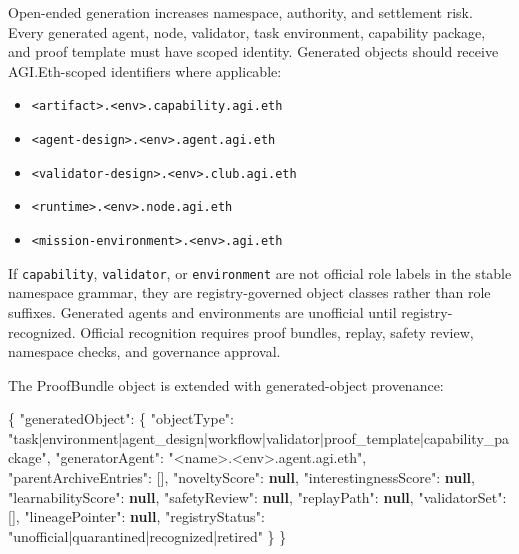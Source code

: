 \documentclass[
  11pt,
]{article}
\newenvironment{Shaded}{}{}
\newcommand{\DataTypeTok}[1]{\textcolor[rgb]{0.56,0.13,0.00}{#1}}
\newcommand{\FunctionTok}[1]{\textcolor[rgb]{0.02,0.16,0.49}{#1}}
\newcommand{\KeywordTok}[1]{\textcolor[rgb]{0.00,0.44,0.13}{\textbf{#1}}}
\newcommand{\OtherTok}[1]{\textcolor[rgb]{0.00,0.44,0.13}{#1}}
\newcommand{\StringTok}[1]{\textcolor[rgb]{0.25,0.44,0.63}{#1}}
\providecommand{\tightlist}{%
  \setlength{\itemsep}{0pt}\setlength{\parskip}{0pt}}
\begin{document}
Open-ended generation increases namespace, authority, and settlement
risk. Every generated agent, node, validator, task environment,
capability package, and proof template must have scoped identity.
Generated objects should receive AGI.Eth-scoped identifiers where
applicable:

\begin{itemize}
\tightlist
\item
  \texttt{\textless{}artifact\textgreater{}.\textless{}env\textgreater{}.capability.agi.eth}
\item
  \texttt{\textless{}agent-design\textgreater{}.\textless{}env\textgreater{}.agent.agi.eth}
\item
  \texttt{\textless{}validator-design\textgreater{}.\textless{}env\textgreater{}.club.agi.eth}
\item
  \texttt{\textless{}runtime\textgreater{}.\textless{}env\textgreater{}.node.agi.eth}
\item
  \texttt{\textless{}mission-environment\textgreater{}.\textless{}env\textgreater{}.agi.eth}
\end{itemize}

If \texttt{capability}, \texttt{validator}, or \texttt{environment} are
not official role labels in the stable namespace grammar, they are
registry-governed object classes rather than role suffixes. Generated
agents and environments are unofficial until registry-recognized.
Official recognition requires proof bundles, replay, safety review,
namespace checks, and governance approval.

The ProofBundle object is extended with generated-object provenance:

\begin{Shaded}
\begin{Highlighting}[]
\FunctionTok{\{}
  \DataTypeTok{"generatedObject"}\FunctionTok{:} \FunctionTok{\{}
    \DataTypeTok{"objectType"}\FunctionTok{:} \StringTok{"task|environment|agent\_design|workflow|validator|proof\_template|capability\_package"}\FunctionTok{,}
    \DataTypeTok{"generatorAgent"}\FunctionTok{:} \StringTok{"\textless{}name\textgreater{}.\textless{}env\textgreater{}.agent.agi.eth"}\FunctionTok{,}
    \DataTypeTok{"parentArchiveEntries"}\FunctionTok{:} \OtherTok{[]}\FunctionTok{,}
    \DataTypeTok{"noveltyScore"}\FunctionTok{:} \KeywordTok{null}\FunctionTok{,}
    \DataTypeTok{"interestingnessScore"}\FunctionTok{:} \KeywordTok{null}\FunctionTok{,}
    \DataTypeTok{"learnabilityScore"}\FunctionTok{:} \KeywordTok{null}\FunctionTok{,}
    \DataTypeTok{"safetyReview"}\FunctionTok{:} \KeywordTok{null}\FunctionTok{,}
    \DataTypeTok{"replayPath"}\FunctionTok{:} \KeywordTok{null}\FunctionTok{,}
    \DataTypeTok{"validatorSet"}\FunctionTok{:} \OtherTok{[]}\FunctionTok{,}
    \DataTypeTok{"lineagePointer"}\FunctionTok{:} \KeywordTok{null}\FunctionTok{,}
    \DataTypeTok{"registryStatus"}\FunctionTok{:} \StringTok{"unofficial|quarantined|recognized|retired"}
  \FunctionTok{\}}
\FunctionTok{\}}
\end{Highlighting}
\end{Shaded}
\end{document}
